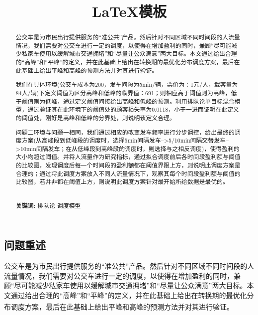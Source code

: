 \documentclass[12pt]{ctexart}
\title{\vspace{-1.5cm} \zihao{3} \heiti \LaTeX 模板}
\date{}
\newcommand\supercite[1]{\textsuperscript{\cite{#1}}}
\begin{document}
\begin{spacing}{1.5}
	
\maketitle	%
\setcounter{page}{1}  %

\vspace{-6.5em}
\begin{abstract}
	公交车是为市民出行提供服务的“准公共”产品。然后针对不同区域不同时间段的人流量情况，我们需要对公交车进行一定的调度，以使得在增加盈利的同时，兼顾“尽可能减少私家车使用以缓解城市交通拥堵”和“尽量让公众满意”两大目标。本文通过给出合理的“高峰”和“平峰”的定义，并在此基础上给出在转换期的最优化分布调度方案，最后在此基础上给出平峰和高峰的预测方法并对其进行验证。
	
	我们在具体环境(公交车成本为200，发车间隔为5min/辆，票价为：1元/人，载客量为84人/辆)下定义阈值为区分高峰和低峰的临界值：691；则相应高于阈值则为高峰，低于阈值则为低峰，通过定义阈值间接给出高峰和低峰的预测。利用排队论单目标混合模型，通过验证其在此环境下的阈值处的顾客损失率为0.0118，小于一进而证明在此定义的阈值处，刚好是高峰和低峰的分界处，则说明该定义合理。

	问题二环境与问题一相同，我们通过相应的改变发车频率进行分步调控，给出最终的调度方案(从高峰段到低峰段的调度时，选择5min间隔发车-->5/10min间隔交替发车-->10min间隔发车；在从低峰段到高峰段的调度时，则选择与之相反调度)，使得盈利的大小均超过阈值。并将人流量作为研究指标，通过拟合调度前后各时间段盈利额与阈值的比较图，发现调度后每一个时间段的盈利额都在阈值界限上方，则说明此调度方案是合理的；通过将此调度方案放入不同人流量情况下，观察其每个时间段盈利额与阈值的比较图，若并非都在阈值上方，则说明此调度方案针对最开始所给数据是最优的。

	~\\
	\textbf{关键词:} \quad 排队论 \quad 调度模型\supercite{参考文献1}
\end{abstract}

\newpage %

\section{问题重述}
	公交车是为市民出行提供服务的“准公共”产品。然后针对不同区域不同时间段的人流量情况，我们需要对公交车进行一定的调度，以使得在增加盈利的同时，兼顾“尽可能减少私家车使用以缓解城市交通拥堵”和“尽量让公众满意”两大目标。本文通过给出合理的“高峰”和“平峰”的定义，并在此基础上给出在转换期的最优化分布调度方案，最后在此基础上给出平峰和高峰的预测方法并对其进行验证\supercite{参考文献2}。
	

\end{spacing}
\end{document}
